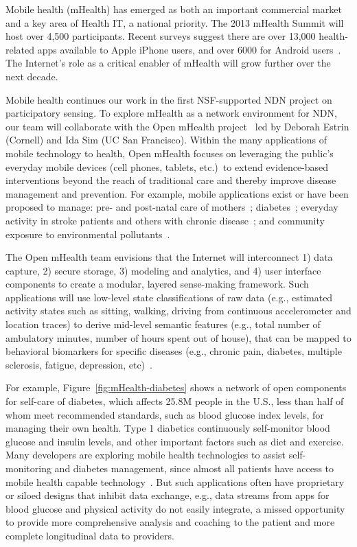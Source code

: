 Mobile health (mHealth) has emerged as both an important commercial
market and a key area of Health IT, a national priority. The 2013 mHealth
Summit
will host over 4,500 participants.  Recent surveys suggest there are
over 13,000 health-related apps available to Apple iPhone
users, and over 6000 for Android users~\cite{Eng_Lee13}.  The 
Internet's role as a critical enabler of mHealth will grow further over
the next decade.

Mobile health continues our work in the first NSF-supported NDN project
on participatory sensing. 
To explore mHealth as a network environment for NDN, our team will
collaborate with the Open mHealth project~\cite{chen2012making}  led by
Deborah Estrin (Cornell) and Ida Sim (UC San Francisco). Within the many
applications of mobile technology to health, Open mHealth focuses on
leveraging the public's everyday mobile devices (cell phones, tablets,
etc.)~to extend evidence-based interventions beyond the reach of traditional
care and thereby improve disease management and prevention.  For
example, mobile applications exist or have been proposed to manage:
pre- and post-natal care of mothers~\cite{Gurman_etal12}; 
diabetes~\cite{Sieverdes_etal13,Tamrat_Kachnowski12}; 
everyday activity in stroke patients and others with chronic
disease~\cite{Dobkin_Dorsch11}; and community exposure to
environmental pollutants~\cite{Ramanathan20114481}.



The Open mHealth team envisions that the Internet will interconnect 1)
data capture, 2) secure storage, 3) modeling and analytics, and 4) user
interface components to create a modular, layered sense-making framework.  
Such applications will use low-level state
classifications of raw data (e.g., estimated activity states such as
sitting, walking, driving from continuous accelerometer and location
traces) to derive mid-level semantic features (e.g., total number of
ambulatory minutes, number of hours spent out of house), that can 
be mapped to behavioral biomarkers for specific diseases
(e.g., chronic pain, diabetes, multiple sclerosis, fatigue, depression,
etc)~\cite{Estrin_IPSN_2013}.


For example, Figure~\ref{fig:mHealth-diabetes} shows a network of open components
for self-care of diabetes, which affects 25.8M people in the U.S., 
less than half of whom meet recommended standards, such as blood
glucose index levels, for managing their own health. Type 1 diabetics
continuously self-monitor blood glucose and insulin levels, and
other important factors such as diet and exercise.  Many developers are
exploring mobile health technologies to assist self-monitoring and
diabetes management, since almost all
patients have access to
mobile health capable technology~\cite{Sieverdes_etal13}.   
But such applications often have proprietary or siloed
designs that inhibit data exchange, e.g., data streams from 
apps for blood glucose and physical activity do not easily
integrate,  %
a missed opportunity to
provide more comprehensive analysis and coaching to the patient and more
complete longitudinal data to providers.

